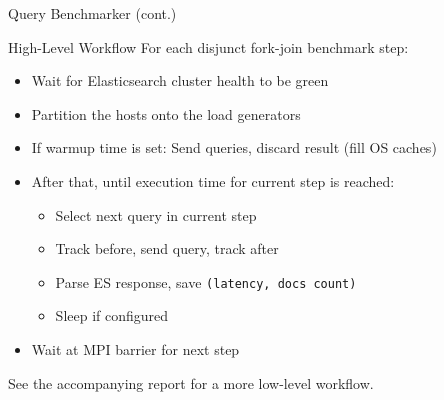 \documentclass[compress,aspectratio=169]{beamer}
\begin{document}
  \begin{frame}{Query Benchmarker (cont.)}
    \begin{block}{High-Level Workflow}
      For each disjunct fork-join benchmark step:
      \pause
      \begin{itemize}
        \item Wait for Elasticsearch cluster health to be green
          \pause
        \item Partition the hosts onto the load generators
          \pause
        \item If warmup time is set: Send queries, discard result (fill OS caches)
          \pause
        \item After that, until execution time for current step is reached:
          \begin{itemize}
            \item Select next query in current step
          \pause
            \item Track before, send query, track after
          \pause
            \item Parse ES response, save \texttt{(latency, docs count)}
          \pause
            \item Sleep if configured
          \end{itemize}
          \pause
        \item Wait at MPI barrier for next step
      \end{itemize}
    \end{block}
          \pause
    \vspace*{-0.5cm}
    \begin{center}
      See the accompanying report for a more low-level workflow.
    \end{center}
  \end{frame}
\end{document}
